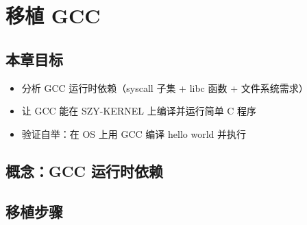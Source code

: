 \chapter{移植 GCC}
\label{ch:port-gcc}

\section{本章目标}

\begin{itemize}
  \item 分析 GCC 运行时依赖（syscall 子集 + libc 函数 + 文件系统需求）
  \item 让 GCC 能在 SZY-KERNEL 上编译并运行简单 C 程序
  \item 验证自举：在 OS 上用 GCC 编译 hello world 并执行
\end{itemize}

\section{概念：GCC 运行时依赖}
\label{sec:gcc-deps}


\section{移植步骤}
\label{sec:gcc-port}


